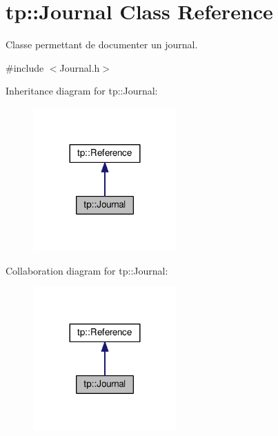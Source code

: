 \hypertarget{classtp_1_1Journal}{}\section{tp\+:\+:Journal Class Reference}
\label{classtp_1_1Journal}


Classe permettant de documenter un journal.  




{\ttfamily \#include $<$Journal.\+h$>$}



Inheritance diagram for tp\+:\+:Journal\+:\nopagebreak
\begin{figure}[H]
\begin{center}
\leavevmode
\includegraphics[width=156pt]{classtp_1_1Journal__inherit__graph}
\end{center}
\end{figure}


Collaboration diagram for tp\+:\+:Journal\+:\nopagebreak
\begin{figure}[H]
\begin{center}
\leavevmode
\includegraphics[width=156pt]{classtp_1_1Journal__coll__graph}
\end{center}
\end{figure}
